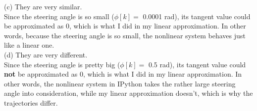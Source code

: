 \documentclass{article}
\begin{document}
(c) They are very similar.\\

Since the steering angle is so small ($\phi[k] = $ 0.0001 rad), its tangent value could be approximated as 0, which is what I did in my linear approximation. In other words, because the steering angle is so small, the nonlinear system behaves just like a linear one.\\[.3cm]

(d) They are very different.\\

Since the steering angle is pretty big ($\phi[k] = $ 0.5 rad), its tangent value could \textbf{not} be approximated as 0, which is what I did in my linear approximation. In other words, the nonlinear system in IPython takes the rather large steering angle into consideration, while my linear approximation doesn't, which is why the trajectories differ.
\end{document}
